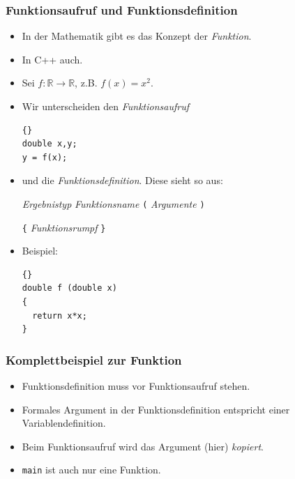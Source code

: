 \documentclass[ignorenonframetext,12pt]{beamer}
\theoremstyle{definition}
\theoremstyle{definition}
\begin{document}
\begin{frame}[fragile]
\frametitle{Funktionsaufruf und Funktionsdefinition}
\begin{itemize}
\item In der Mathematik gibt es das Konzept der \textsl{Funktion}.
\item In C++ auch.
\item Sei $f : \mathbb{R} \to \mathbb{R}$, z.B. $f(x) = x^2$.
\item Wir unterscheiden den \textsl{Funktionsaufruf}
{\scriptsize\begin{lstlisting}{}
double x,y;
y = f(x);
\end{lstlisting}}
\item und die \textsl{Funktionsdefinition}. Diese sieht so aus:

\medskip
\textsl{Ergebnistyp} \textsl{Funktionsname} \lstinline{(} \textsl{Argumente} \lstinline{)}

\lstinline!{! \textsl{Funktionsrumpf} \lstinline!}!

\medskip
\item Beispiel:
{\scriptsize\begin{lstlisting}{}
double f (double x)
{
  return x*x;
}
\end{lstlisting}}
\end{itemize}
\end{frame}

\begin{frame}[fragile]
\frametitle{Komplettbeispiel zur Funktion}

\begin{itemize}
\item Funktionsdefinition muss vor Funktionsaufruf stehen.
\item Formales Argument in der Funktionsdefinition entspricht einer Variablendefinition.
\item Beim Funktionsaufruf wird das Argument (hier) \textsl{kopiert}.
\item \lstinline{main} ist auch nur eine Funktion.
\end{itemize}
\end{frame}
\end{document}
